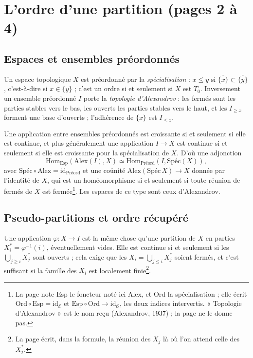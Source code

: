 \documentclass[11pt,a4paper]{article}
\begin{document}
\section*{L'ordre d'une partition (pages 2 à 4)}

\subsection*{Espaces et ensembles préordonnés}

Un espace topologique $X$ est préordonné par la \emph{spécialisation} : $x \leq y$
si $\overline{\{x\}} \subset \overline{\{y\}}$, c'est-à-dire si $x \in
\overline{\{y\}}$ ; c'est un ordre si et seulement si $X$ est $T_0$. Inversement un
ensemble préordonné $I$ porte la \emph{topologie d'Alexandrov} : les fermés sont
les parties stables vers le bas, les ouverts les parties stables vers le haut,
et les $I_{\geq x}$ forment une base d'ouverts ; l'adhérence de $\{x\}$ est
$I_{\leq x}$.

Une application entre ensembles préordonnés est croissante si et seulement si
elle est continue, et plus généralement une application $I \to X$ est continue
si et seulement si elle est croissante pour la spécialisation de $X$. D'où une
adjonction
\[
\mathrm{Hom}_{\mathrm{Esp}}(\mathrm{Alex}(I), X) \simeq
\mathrm{Hom}_{\mathrm{Préord}}(I, \mathrm{Spéc}(X)),
\]
avec $\mathrm{Spéc} \circ \mathrm{Alex} = \mathrm{id}_{\mathrm{Préord}}$ et une
coünité $\mathrm{Alex}(\mathrm{Spéc}\,X) \to X$ donnée par l'identité de $X$,
qui est un homéomorphisme si et seulement si toute réunion de fermés de $X$ est
fermée\footnote{La page note $\mathrm{Esp}$ le foncteur noté ici
$\mathrm{Alex}$, et $\mathrm{Ord}$ la spécialisation ; elle écrit
$\mathrm{Ord} \circ \mathrm{Esp} = \mathrm{id}_{\mathcal{E}}$ et $\mathrm{Esp}
\circ \mathrm{Ord} \to \mathrm{id}_{\mathcal{O}}$, les deux indices intervertis.
« Topologie d'Alexandrov » est le nom reçu (Alexandrov, 1937) ; la page ne le
donne pas.}. Les espaces de ce type sont ceux d'Alexandrov.

\subsection*{Pseudo-partitions et ordre récupéré}

Une application $\varphi : X \to I$ est la même chose qu'une partition de $X$ en
parties $X^{*}_i = \varphi^{-1}(i)$, éventuellement vides. Elle est continue si
et seulement si les $\bigcup_{j \geq i} X^{*}_j$ sont ouverts ; cela exige que
les $X_i = \bigcup_{j \leq i} X^{*}_j$ soient fermés, et c'est suffisant si la
famille des $X_i$ est localement finie\footnote{La page écrit, dans la formule,
la réunion des $X_j$ là où l'on attend celle des $X^{*}_j$.}.
\end{document}
